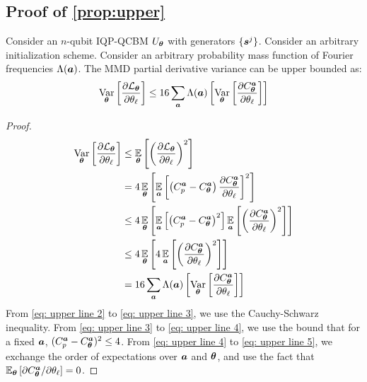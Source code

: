 \documentclass[10pt, twocolumn, a4paper]{article}
\theoremstyle{plain}
\theoremstyle{definition}
\theoremstyle{remark}
\begin{document}
\subsection{Proof of \cref{prop:upper}}
Consider an $n$-qubit IQP-QCBM $U_{\bm{\theta}}$ with generators $\{{\bm{s}^j}\}$. Consider an arbitrary initialization scheme. Consider an arbitrary probability mass function of Fourier frequencies $\Lambda({\bm{a}})$. The MMD partial derivative variance can be upper bounded as:
\begin{equation}
    \operatorname*{Var}_{{\bm{\theta}}} \left[ \frac{\partial \mathcal{L}_{\bm{\theta}}}{\partial \theta_\ell} \right] \leq 16 \sum_{\bm{a}} \Lambda({\bm{a}})\left[  \operatorname*{Var}_{{\bm{\theta}}} \left[ \frac{\partial C^{\bm{a}}_{\bm{\theta}}}{\partial \theta_\ell} \right]\right]
\end{equation}
\begin{proof}
\begin{align}
\operatorname*{Var}_{{\bm{\theta}}} \left[ \frac{\partial \mathcal{L}_{\bm{\theta}}}{\partial \theta_\ell} \right] &\leq \operatorname*{\mathbb{E}}_{{\bm{\theta}}} \left[ \left(\frac{\partial \mathcal{L}_{\bm{\theta}}}{\partial \theta_\ell} \right)^2 \right] \\
&= 4\operatorname*{\mathbb{E}}_{{\bm{\theta}}} \left[  \operatorname*{\mathbb{E}}_{{\bm{a}}}\left[\left( C^{\bm{a}}_p - C^{\bm{a}}_{\bm{\theta}} \right) \frac{\partial C^{\bm{a}}_{\bm{\theta}}}{\partial \theta_\ell} \right]^2  \right] \label{eq: upper line 2}\\
&\leq 4\operatorname*{\mathbb{E}}_{{\bm{\theta}}} \left[  \operatorname*{\mathbb{E}}_{{\bm{a}}}\left[\left( C^{\bm{a}}_p - C^{\bm{a}}_{\bm{\theta}} \right)^2 \right] \operatorname*{\mathbb{E}}_{{\bm{a}}}\left[\left(\frac{\partial C^{\bm{a}}_{\bm{\theta}}}{\partial \theta_\ell} \right)^2\right]\right] \label{eq: upper line 3}\\
&\leq 4\operatorname*{\mathbb{E}}_{{\bm{\theta}}} \left[  4 \operatorname*{\mathbb{E}}_{{\bm{a}}}\left[\left(\frac{\partial C^{\bm{a}}_{\bm{\theta}}}{\partial \theta_\ell} \right)^2\right]\right] \label{eq: upper line 4}\\
&= 16 \sum_{\bm{a}} \Lambda({\bm{a}})\left[  \operatorname*{Var}_{{\bm{\theta}}} \left[ \frac{\partial C^{\bm{a}}_{\bm{\theta}}}{\partial \theta_\ell} \right]\right] \label{eq: upper line 5}
\end{align}
From \cref{eq: upper line 2} to \cref{eq: upper line 3}, we use the Cauchy-Schwarz inequality. From \cref{eq: upper line 3} to \cref{eq: upper line 4}, we use the bound that for a fixed ${\bm{a}}$, $(C^{\bm{a}}_p - C^{\bm{a}}_{\bm{\theta}})^2 \leq 4$. From \cref{eq: upper line 4} to \cref{eq: upper line 5}, we exchange the order of expectations over ${\bm{a}}$ and ${\bm{\theta}}$, and use the fact that $\operatorname*{\mathbb{E}}_{{\bm{\theta}}}\left[\partial C^{\bm{a}}_{\bm{\theta}} / \partial \theta_\ell\right] = 0$.
\end{proof}
\end{document}

